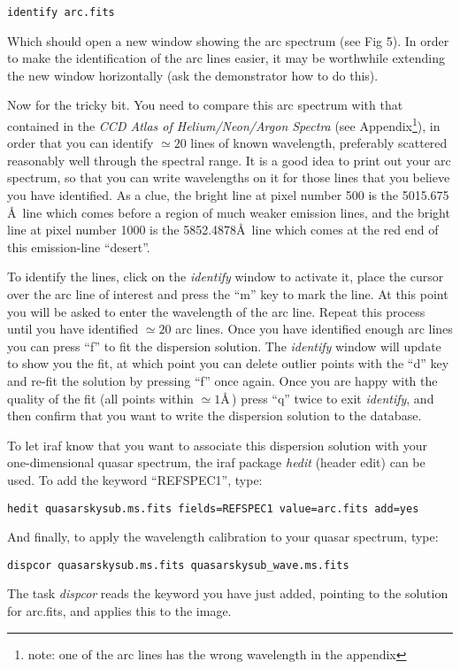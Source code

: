 {\tt identify arc.fits}

Which should open a new window showing the arc spectrum (see Fig 5). 
In order to make the identification of the arc lines easier, it
may be worthwhile extending the new window horizontally (ask the
demonstrator how to do this).

Now for the tricky bit. You need to compare this arc spectrum with that
contained in the {\em CCD Atlas of Helium/Neon/Argon Spectra} (see Appendix\footnote{note: one of the 
arc lines has the wrong wavelength in the appendix}), 
in order that you can identify $\simeq 20$ lines of known wavelength, preferably
scattered reasonably well through the spectral range. 
It is a good idea to print out your arc spectrum, so that you can write
wavelengths on it for those lines that you believe you have identified.
As a clue, the bright line at pixel number 500 is the 5015.675 \AA\ line
which comes before a region of much weaker emission lines, and the bright
line at pixel number 1000 is the 5852.4878\AA\ line which comes at the red
end of this emission-line ``desert''. 


To identify the lines, click on the {\it identify} window to activate
it, place the cursor over the arc line of interest and press the ``m''
key to mark the line. At this point you will be asked to enter the
wavelength of the arc line. Repeat this process
until you have identified $\simeq20$ arc lines. Once you have
identified enough arc lines you can press ``f'' to fit the dispersion
solution. The {\it identify} window will update to show you the fit,
at which point you can delete outlier points with the ``d'' key and
re-fit the solution by pressing ``f'' once again. Once you are happy
with the quality of the fit (all points within $\simeq1$\AA\,) press
``q'' twice to exit {\it identify}, and then confirm that you want to 
write the dispersion solution to the database.

To let {\sc iraf} know that you want to associate this dispersion
solution with your one-dimensional quasar spectrum, the {\sc iraf} package {\it hedit} (header edit) can be used. To add
the keyword ``REFSPEC1'', type:

{\tt hedit quasarskysub.ms.fits fields=REFSPEC1 value=arc.fits add=yes}

And finally, to apply the wavelength calibration to your quasar
spectrum, type:

{\tt dispcor quasarskysub.ms.fits \verb,quasarskysub_wave.ms.fits,}

The task {\it dispcor} reads the keyword you have just added, pointing to the solution for {\sc arc.fits}, and
applies this to the image.

